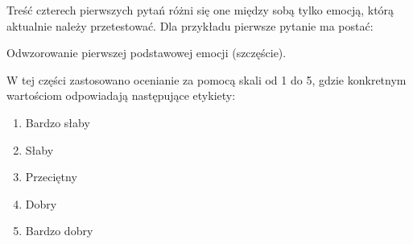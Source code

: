 Treść czterech pierwszych pytań różni się one między sobą tylko emocją, którą aktualnie należy przetestować. Dla przykładu pierwsze pytanie ma postać:
\begin{center}
    Odwzorowanie pierwszej podstawowej emocji (szczęście).
\end{center}

W tej części zastosowano ocenianie za pomocą skali od 1 do 5, gdzie konkretnym wartościom odpowiadają następujące etykiety:
\begin{enumerate}
    \item Bardzo słaby
    \item Słaby
    \item Przeciętny
    \item Dobry
    \item Bardzo dobry

\end{enumerate}

